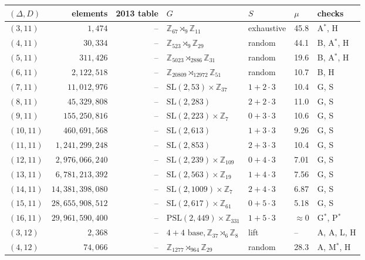 \documentclass[11pt]{amsart}
\theoremstyle{definition}
\theoremstyle{remark}
\begin{document}
\begin{table}[ht]
\centering\scriptsize
\setlength{\tabcolsep}{3.5pt}
\begin{tabular}{@{}lrr>{\raggedright}p{}llp{}@{}}
\toprule
$(\Delta,D)$ & elements & 2013 table & $G$ & $S$ & $\mu$ & checks\\
\midrule
$(3,11)$ & $1{,}474$ & -- & $\mathbb{Z}_{67}\rtimes_{9}\mathbb{Z}_{11}$ & exhaustive & 45.8 & A$^\ast$, H\\
$(4,11)$ & $30{,}334$ & -- & $\mathbb{Z}_{523}\rtimes_{9}\mathbb{Z}_{29}$ & random & 44.1 & B, A$^\ast$, H\\
$(5,11)$ & $311{,}426$ & -- & $\mathbb{Z}_{5023}\rtimes_{2886}\mathbb{Z}_{31}$ & random & 19.6 & B, A$^\ast$, H\\
$(6,11)$ & $2{,}122{,}518$ & -- & $\mathbb{Z}_{20809}\rtimes_{12972}\mathbb{Z}_{51}$ & random & 10.7 & B, H\\
$(7,11)$ & $11{,}012{,}976$ & -- & $\mathrm{SL}(2,53)\times\mathbb{Z}_{37}$ & $1+2\cdot3$ & 10.4 & G, S\\
$(8,11)$ & $45{,}329{,}808$ & -- & $\mathrm{SL}(2,283)$ & $2+2\cdot3$ & 11.0 & G, S\\
$(9,11)$ & $155{,}250{,}816$ & -- & $\mathrm{SL}(2,223)\times\mathbb{Z}_{7}$ & $0+3\cdot3$ & 10.6 & G, S\\
$(10,11)$ & $460{,}691{,}568$ & -- & $\mathrm{SL}(2,613)$ & $1+3\cdot3$ & 9.26 & G, S\\
$(11,11)$ & $1{,}241{,}299{,}248$ & -- & $\mathrm{SL}(2,853)$ & $2+3\cdot3$ & 10.4 & G, S\\
$(12,11)$ & $2{,}976{,}066{,}240$ & -- & $\mathrm{SL}(2,239)\times\mathbb{Z}_{109}$ & $0+4\cdot3$ & 7.01 & G, S\\
$(13,11)$ & $6{,}781{,}213{,}392$ & -- & $\mathrm{SL}(2,563)\times\mathbb{Z}_{19}$ & $1+4\cdot3$ & 7.56 & G, S\\
$(14,11)$ & $14{,}381{,}398{,}080$ & -- & $\mathrm{SL}(2,1009)\times\mathbb{Z}_{7}$ & $2+4\cdot3$ & 6.87 & G, S\\
$(15,11)$ & $28{,}655{,}908{,}512$ & -- & $\mathrm{SL}(2,617)\times\mathbb{Z}_{61}$ & $0+5\cdot3$ & 5.18 & G, S\\
$(16,11)$ & $29{,}961{,}590{,}400$ & -- & $\mathrm{PSL}(2,449)\times\mathbb{Z}_{331}$ & $1+5\cdot3$ & $\approx0$ & G$^\ast$, P$^\ast$\\
$(3,12)$ & $2{,}368$ & -- & $4+4 \text{ base}, \mathbb{Z}_{37}\rtimes_{6}\mathbb{Z}_{8}$ & lift & -- & A, A, L, H\\
$(4,12)$ & $74{,}066$ & -- & $\mathbb{Z}_{1277}\rtimes_{964}\mathbb{Z}_{29}$ & random & 28.3 & A, M$^\ast$, H\\

\end{tabular}
\end{table}
\end{document}
